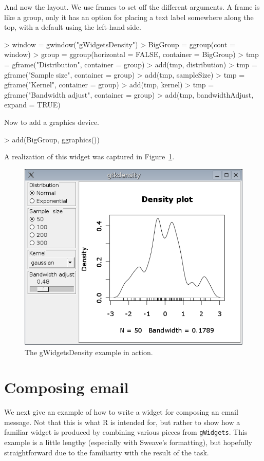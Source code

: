 \documentclass[12pt]{article}
\newcommand{\RCode}[1]{\texttt{#1}}
\begin{document}
And now the layout. We use frames to set off the different
arguments. A frame is like a group, only it has an option for placing
a text label somewhere along the top, with a default using the left-hand
side.
\begin{Schunk}
\begin{Sinput}
> window = gwindow("gWidgetsDensity")
> BigGroup = ggroup(cont = window)
> group = ggroup(horizontal = FALSE, container = BigGroup)
> tmp = gframe("Distribution", container = group)
> add(tmp, distribution)
> tmp = gframe("Sample  size", container = group)
> add(tmp, sampleSize)
> tmp = gframe("Kernel", container = group)
> add(tmp, kernel)
> tmp = gframe("Bandwidth adjust", container = group)
> add(tmp, bandwidthAdjust, expand = TRUE)
\end{Sinput}
\end{Schunk}

Now to add a graphics device.
\begin{Soutput}
> add(BigGroup, ggraphics())
\end{Soutput}


A realization of this widget was captured in Figure~\ref{fig:gtkdensity}.

\begin{figure}
  \centering
  \includegraphics[width=.6\textwidth]{gtkdensity}
  \caption{The gWidgetsDensity example in action.}
  \label{fig:gtkdensity}
\end{figure}



\section{Composing email}

We next give an example of how to write a widget for composing an
email message. Not that this is what R is intended for, but rather to
show how a familiar widget is produced by combining various pieces
from \RCode{gWidgets}. This example is a little lengthy (especially
with Sweave's formatting), but hopefully straightforward due to the
familiarity with the result of the task.
\end{document}
